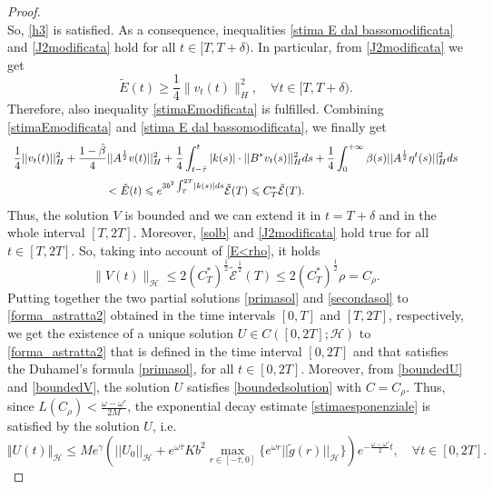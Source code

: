 \documentclass[11pt]{article}
\renewcommand{\geq}{\geqslant}
\renewcommand{\leq}{\leqslant}
\renewcommand{\le}{\leqslant}
\begin{document}
\begin{proof}
\begin{equation}
\end{equation}
So, \eqref{h3} is satisfied. As a consequence, inequalities \eqref{stima E dal bassomodificata} and \eqref{J2modificata} hold for all $t\in [T,T+\delta)$. In particular, from \eqref{J2modificata} we get $$\tilde E(t)\geq \frac{1}{4}\lVert v_t(t)\rVert_H^2,\quad \forall t\in [T,T+\delta).$$
Therefore, also inequality \eqref{stimaEmodificata} is fulfilled. Combining \eqref{stimaEmodificata} and \eqref{stima E dal bassomodificata}, we finally get
\begin{equation}\label{solb}
	\begin{array}{l}
		\vspace{0.2cm}\displaystyle{\frac{1}{4}||v_t(t)||_H^2+\frac{1-\tilde{\beta}}{4}||A^\frac{1}{2}v(t)||_H^2+\frac{1}{4}\int_{t-\bar\tau}^t |k(s)| \cdot ||B^*v_t(s)||_H^2 ds+\frac{1}{4}\int_0^{+\infty} \beta(s) ||A^\frac{1}{2}\eta^t (s)||_H^2 ds}\\
		\displaystyle{\hspace{3cm}<\tilde{E}(t)\leq e^{3b^2\int_{T}^{2T}\lvert k(s)\rvert ds}\tilde {\mathcal{E}}(T)\leq C^*_T\tilde{\mathcal{E}}(T).}
	\end{array}
\end{equation}
Thus, the solution $V$ is bounded and we can extend it in $t=T+\delta$ and in the whole interval $[T,2T]$. Moreover, \eqref{solb} and \eqref{J2modificata} hold true for all $t\in [T,2T]$. So, taking into account of \eqref{E<rho}, it holds
\begin{equation}\label{boundedV}
	\lVert V(t)\rVert_{\mathcal{H}}\leq 2(C_T^*)^{\frac{1}{2}}\tilde{\mathcal{E}}^{\frac{1}{2}}(T)\leq 2(C_T^*)^{\frac{1}{2}}\rho=C_\rho.
\end{equation}
Putting together the two partial solutions \eqref{primasol} and \eqref{secondasol} to \eqref{forma_astratta2} obtained in the time intervals $[0,T]$ and $[T,2T]$, respectively, we get the existence of a unique solution $U\in C([0,2T];\mathcal{H})$ to \eqref{forma_astratta2} that is defined in the time interval $[0,2T]$ and that satisfies the Duhamel's formula \eqref{primasol}, for all $t\in [0,2T]$. Moreover, from \eqref{boundedU} and \eqref{boundedV}, the solution $U$ satisfies \eqref{boundedsolution} with $C=C_\rho$. Thus, since $L(C_\rho)<\frac{\omega-\omega'}{2M}$, the exponential decay estimate \eqref{stimaesponenziale} is satisfied by the solution $U$, i.e. $$\Vert  U(t)\Vert_{\mathcal H}\le Me^{\gamma}\left(||U_0||_{\mathcal H}+e^{\omega\bar{\tau}}Kb^2\max_{r\in[-\bar{\tau},0]}\{e^{\omega r}||\tilde{g}(r)||_{\mathcal H}\}\right)e^{-\frac{\omega-\omega'}{2}t},\quad\forall t\in [0,2T].$$

\end{proof}
\end{document}
